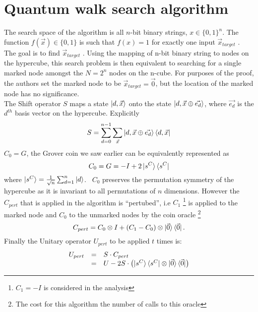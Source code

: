 \documentclass{article}
\begin{document}
\section{Quantum walk search algorithm}
The search space of the algorithm is all $n$-bit binary strings, $x \in \{0,1\}^n$. The function $f(\vec{x}) \in \{0,1\}$ is such that $f(x) = 1$ for exactly one input $\vec{x}_{target}$ . The goal is to find $\vec{x}_{target}$ . Using the mapping of n-bit binary string to nodes on the hypercube, this search problem is then equivalent to searching for a single marked node amongst the $N = 2^n$ nodes on the n-cube. For purposes of the proof, the authors set the marked node to be $\vec{x}_{target} = \vec{0}$, but the location of the marked node has no significance.\\
The Shift operator $S$ maps a state $\ket{d, \vec{x}}$ onto the state $\ket{d, \vec{x} \oplus \vec{e_d}}$, where
$\vec{e_d}$ is the $d^{th}$ basis vector on the hypercube. Explicitly
\begin{equation}
S = \sum_{d=0}^{n-1}{\sum_{\vec{x}}{
\ket{d, \vec{x} \oplus \vec{e_d}}\bra{d, \vec{x}}}}    
\end{equation}
$C_0 = G$, the Grover coin we saw earlier can be equivalently represented as
\begin{equation}
C_0  = G = -I + 2\ket{s^C}\bra{s^C}
\end{equation}
where $\ket{s^C} = \frac{1}{\sqrt{n}} \sum_{d=1}^{n}{\ket{d}}$.~ 
$C_0$ preserves the permutation symmetry of the hypercube as it is invariant to all permutations of $n$ dimensions.
However the $C_{pert}$ that is applied in the algorithm is ``pertubed'', i.e $C_1$ \footnote{$C_1 = -I$ is considered in the analysis} is applied to the marked node and $C_0$ to the unmarked nodes by the coin oracle \footnote{The cost for this algorithm the number of calls to this oracle}
\begin{equation}
C_{pert} = C_0 \otimes I + \left(C_1 -
C_0\right)\otimes\ket{\vec{0}}\bra{\vec{0}}.
\end{equation}
Finally the Unitary operator $U_{pert}$ to be applied $t$ times is:
\begin{equation}
\begin{array}{rcl}
U_{pert}  & = & S \cdot C_{pert}\\
& = & U - 2S \cdot \left(\ket{s^C}\bra{s^C} \otimes \ket{\vec{0}}\bra{\vec{0}}
\right)
\end{array}
\end{equation}
\end{document}

